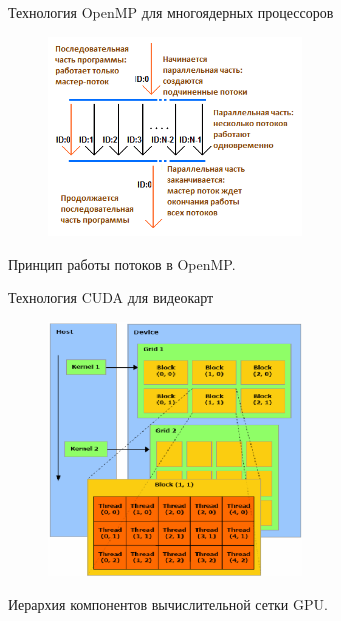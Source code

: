 \documentclass[10pt,pdf, mathserif, hyperref={unicode}]{beamer}
\begin{document}

\begin{frame}{Технология OpenMP для многоядерных процессоров}
	\begin{figure}[h]
		\centering 
		\includegraphics[width=0.6\textwidth]{omp}
	\end{figure}
	\centering
	Принцип работы потоков в OpenMP.
\end{frame}
\begin{frame}{Технология CUDA для видеокарт}
	\begin{figure}[h]
		\centering
		\includegraphics[width=0.6\textwidth]{cuda}
	\end{figure}
	\centering
	Иерархия компонентов вычислительной сетки GPU.
\end{frame}
\end{document}
